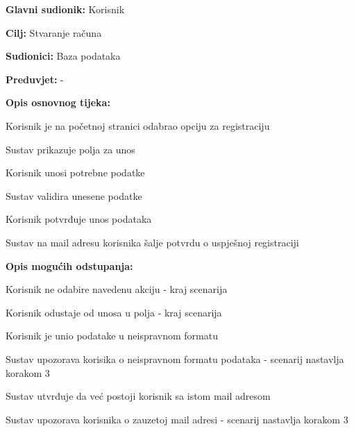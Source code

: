 					\noindent {}
					\begin{packed_item}
	
						\item \textbf{Glavni sudionik: }Korisnik
						\item  \textbf{Cilj:} Stvaranje računa
						\item  \textbf{Sudionici:} Baza podataka
						\item  \textbf{Preduvjet:} -
						\item  \textbf{Opis osnovnog tijeka:}
						
						\item[] \begin{packed_enum}
							\item Korisnik je na početnoj stranici odabrao opciju za registraciju
							\item Sustav prikazuje polja za unos
							\item Korisnik unosi potrebne podatke
							\item Sustav validira unesene podatke
							\item Korisnik potvrđuje unos podataka
							\item Sustav na mail adresu korisnika šalje potvrdu o uspješnoj registraciji
						\end{packed_enum}
						
						\item  \textbf{Opis mogućih odstupanja:}

						\item[] \begin{packed_item}
							\item[1.a] Korisnik ne odabire navedenu akciju - kraj scenarija
							\item[3.a] Korisnik odustaje od unosa u polja - kraj scenarija
							\item[4.a] Korisnik je unio podatake u neispravnom formatu
							\item[] \begin{packed_enum}
								\item Sustav upozorava korisika o neispravnom formatu podataka - scenarij nastavlja korakom 3 
							\end{packed_enum}	
							\item[6.a] Sustav utvrđuje da već postoji korisnik sa istom mail adresom
							\item[] \begin{packed_enum}
								\item Sustav upozorava korisnika o zauzetoj mail adresi - scenarij nastavlja korakom 3 
							\end{packed_enum}					
						\end{packed_item}
					\end{packed_item}

